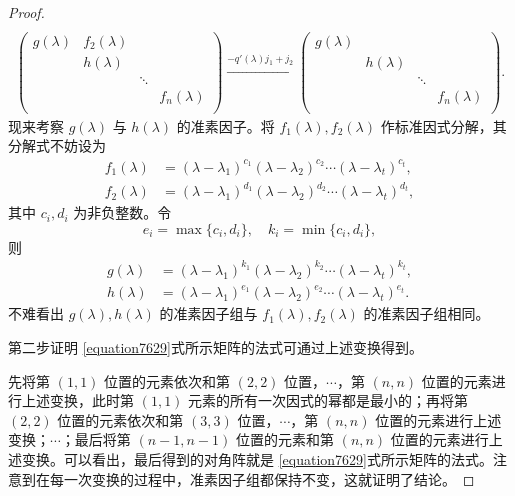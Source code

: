 \documentclass[../../main.tex]{subfiles}
\begin{document}
\begin{proof}
\begin{gather*}
\\
\left( \begin{matrix}
g(\lambda )&		f_2\left( \lambda \right)&		&		\\
&		h(\lambda )&		&		\\
&		&		\ddots&		\\
&		&		&		f_n(\lambda )\\
\end{matrix} \right) \xrightarrow{-q\prime (\lambda )j_1+j_2}\left( \begin{matrix}
g(\lambda )&		&		&		\\
&		h(\lambda )&		&		\\
&		&		\ddots&		\\
&		&		&		f_n(\lambda )\\
\end{matrix} \right) .
\end{gather*}
现来考察 $g(\lambda)$ 与 $h(\lambda)$ 的准素因子。将 $f_1(\lambda), f_2(\lambda)$ 作标准因式分解，其分解式不妨设为
\begin{align*}
f_1(\lambda)&=(\lambda - \lambda_1)^{c_1}(\lambda - \lambda_2)^{c_2}\cdots(\lambda - \lambda_t)^{c_t},\\
f_2(\lambda)&=(\lambda - \lambda_1)^{d_1}(\lambda - \lambda_2)^{d_2}\cdots(\lambda - \lambda_t)^{d_t},
\end{align*}
其中 $c_i, d_i$ 为非负整数。令
\[
e_i = \max\{c_i, d_i\},\quad k_i = \min\{c_i, d_i\},
\]
则
\begin{align*}
g(\lambda)&=(\lambda - \lambda_1)^{k_1}(\lambda - \lambda_2)^{k_2}\cdots(\lambda - \lambda_t)^{k_t},\\
h(\lambda)&=(\lambda - \lambda_1)^{e_1}(\lambda - \lambda_2)^{e_2}\cdots(\lambda - \lambda_t)^{e_t}.
\end{align*}
不难看出 $g(\lambda), h(\lambda)$ 的准素因子组与 $f_1(\lambda), f_2(\lambda)$ 的准素因子组相同。 

第二步证明 \eqref{equation7629}式所示矩阵的法式可通过上述变换得到。

先将第 $(1,1)$ 位置的元素依次和第 $(2,2)$ 位置，$\cdots$，第 $(n,n)$ 位置的元素进行上述变换，此时第 $(1,1)$ 元素的所有一次因式的幂都是最小的；再将第 $(2,2)$ 位置的元素依次和第 $(3,3)$ 位置，$\cdots$，第 $(n,n)$ 位置的元素进行上述变换；$\cdots$；最后将第 $(n - 1,n - 1)$ 位置的元素和第 $(n,n)$ 位置的元素进行上述变换。可以看出，最后得到的对角阵就是 \eqref{equation7629}式所示矩阵的法式。注意到在每一次变换的过程中，准素因子组都保持不变，这就证明了结论。

\end{proof}
\end{document}
